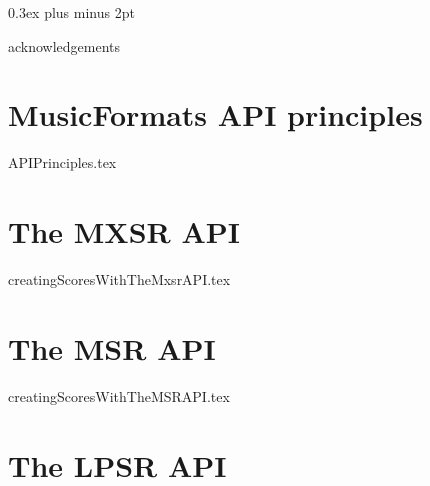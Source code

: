 \documentclass[11pt,a4paper]{report}
\begin{document}
{ %
  \setlength {\parskip} {0.3ex plus \baselineskip minus 2pt}

  \tableofcontents

  \listoffigures
}



\newpage

{acknowledgements}


\part{MusicFormats API principles}

{APIPrinciples.tex}


\part{The MXSR API}

\useRegularPagesHeadersAndFooters


{creatingScoresWithTheMxsrAPI.tex}


\part{The MSR API}

{creatingScoresWithTheMSRAPI.tex}


\part{The LPSR API}
\end{document}
